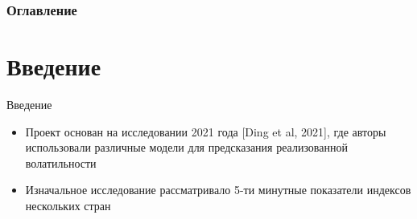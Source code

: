 \documentclass[11pt]{beamer} %
\begin{document}

\frame{\titlepage} %

\begin{frame}
    \frametitle{Оглавление}
    \tableofcontents
\end{frame}




\section{Введение}
    \begin{frame}{Введение}
        \item 
    \begin{itemize}
        \item Проект основан на исследовании 2021 года [Ding et al, 2021], где авторы использовали различные модели для предсказания реализованной волатильности \\
        \item Изначальное исследование рассматривало 5-ти минутные показатели индексов нескольких стран
        \end{itemize}
    \end{frame}
\end{document}

